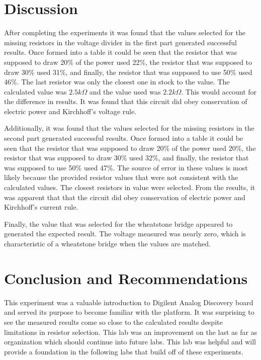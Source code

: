 \section{Discussion}
\label{sec:Discussion}
After completing the experiments it was found that the values selected for
the missing resistors in the voltage divider in the first part generated successful results.
Once formed into a table it could be seen that the resistor that was supposed to draw 20\% of the power
used 22\%, the resistor that was supposed to draw 30\% used 31\%, and finally,
the resistor that was supposed to use 50\% used 46\%. The last resistor was
only the closest one in stock to the value. The calculated value was $2.5 k\Omega$
and the value used was $2.2 k\Omega$. This would account for the difference in results.
It was found that this circuit did obey conservation of electric power and Kirchhoff's voltage rule.

Additionally, it was found that the values selected for
the missing resistors in the second part generated successful results.
Once formed into a table it could be seen that the resistor that was supposed to draw 20\% of the power
used 20\%, the resistor that was supposed to draw 30\% used 32\%, and finally,
the resistor that was supposed to use 50\% used 47\%. The source of error in these values
is most likely because the provided resistor values that were not consistent with
the calculated values. The closest resistors in value were selected. From the results, it was
apparent that that the circuit did obey conservation of electric power and Kirchhoff's current rule.

Finally, the value that was selected for the wheatstone bridge appeared to generated the
expected result. The voltage measured was nearly zero, which is characteristic of
a wheatstone bridge when the values are matched.

\section{Conclusion and Recommendations}
\label{sec:Conclusion}
This experiment was a valuable introduction to Digilent Analog Discovery board
and served its purpose to become familiar with the platform. It was surprising to
see the measured results come so close to the calculated results despite limitations
in resistor selection. This lab was an improvement on the last as far as organization
which should continue into future labs. This lab was helpful and will provide a
foundation in the following labs that build off of these experiments.
